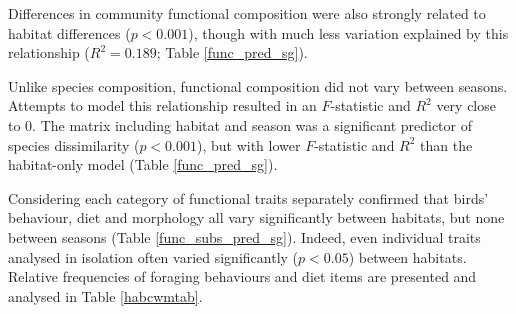 Differences in community functional composition were also strongly related to habitat differences ($p < 0.001$), though with much less variation explained by this relationship ($R^2 = 0.189$; Table \ref{func_pred_sg}). 

Unlike species composition, functional composition did not vary between seasons. Attempts to model this relationship resulted in an $F$-statistic and $R^2$ very close to $0$. The matrix including habitat and season was a significant predictor of species dissimilarity ($p < 0.001$), but with lower $F$-statistic and $R^2$ than the habitat-only model (Table \ref{func_pred_sg}).

Considering each category of functional traits separately confirmed that birds' behaviour, diet and morphology all vary significantly between habitats, but none between seasons (Table \ref{func_subs_pred_sg}). Indeed, even individual traits analysed in isolation often varied significantly ($p < 0.05$) between habitats. Relative frequencies of foraging behaviours and diet items are presented and analysed in Table \ref{habcwmtab}.


